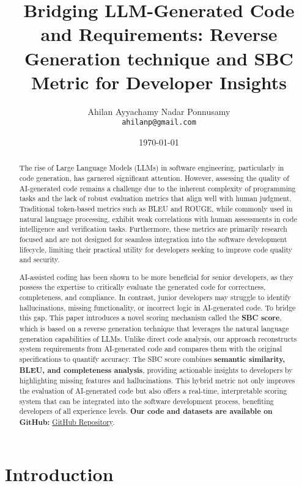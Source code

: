 \documentclass{article}
\title{Bridging LLM-Generated Code and Requirements: Reverse Generation technique and SBC Metric for Developer Insights}
\author{Ahilan Ayyachamy Nadar Ponnusamy\\ \texttt{ahilanp@gmail.com}}
\date{\today}
\begin{document}
\maketitle

\begin{abstract}
The rise of Large Language Models (LLMs) in software engineering, particularly in code generation, has garnered significant attention. However, assessing the quality of AI-generated code remains a challenge due to the inherent complexity of programming tasks and the lack of robust evaluation metrics that align well with human judgment. Traditional token-based metrics such as BLEU and ROUGE, while commonly used in natural language processing, exhibit weak correlations with human assessments in code intelligence and verification tasks. Furthermore, these metrics are primarily research focused and are not designed for seamless integration into the software development lifecycle, limiting their practical utility for developers seeking to improve code quality and security.

AI-assisted coding has been shown to be more beneficial for senior developers, as they possess the expertise to critically evaluate the generated code for correctness, completeness, and compliance. In contrast, junior developers may struggle to identify hallucinations, missing functionality, or incorrect logic in AI-generated code. To bridge this gap, This paper introduces a novel scoring mechanism called the \textbf{SBC score}, which is based on a reverse generation technique that leverages the natural language generation capabilities of LLMs. Unlike direct code analysis, our approach reconstructs system requirements from AI-generated code and compares them with the original specifications to quantify accuracy. The SBC score combines \textbf{semantic similarity, BLEU, and completeness analysis}, providing actionable insights to developers by highlighting missing features and hallucinations. This hybrid metric not only improves the evaluation of AI-generated code but also offers a real-time, interpretable scoring system that can be integrated into the software development process, benefiting developers of all experience levels.  \textbf{Our code and datasets are available on GitHub: }\href{https://github.com/AhilanPonnusamy/Reverse-Generation-and-SBC-Metric--Reference-Implementation}{GitHub Repository}.

\end{abstract}

\section{Introduction}
\end{document}
